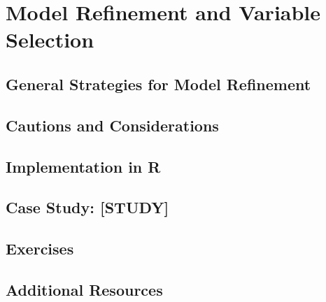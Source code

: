 
\chapter{Model Refinement and Variable Selection}

\section{General Strategies for Model Refinement}

\section{Cautions and Considerations}

\section{Implementation in R}

\section{Case Study: [STUDY]}

\section{Exercises}

\section{Additional Resources}
